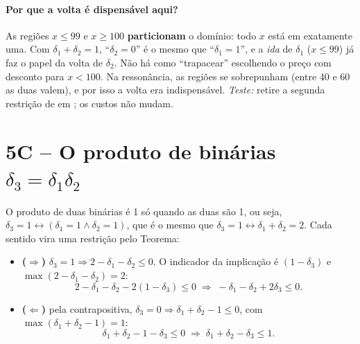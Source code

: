 \paragraph{Por que a volta é dispensável aqui?} As regiões $x\le99$ e $x\ge100$ \textbf{particionam} o domínio:
todo $x$ está em exatamente uma. Com $\delta_1+\delta_2=1$, ``$\delta_2=0$'' é o mesmo que ``$\delta_1=1$'', e a
\emph{ida} de $\delta_1$ ($x\le99$) já faz o papel da volta de $\delta_2$. Não há como ``trapacear'' escolhendo o
preço com desconto para $x<100$. Na ressonância, as regiões se sobrepunham (entre 40 e 60 as duas valem), e por isso
a volta era indispensável. \emph{Teste:} retire a segunda restrição de  em ; os
custos não mudam.

\section{5C -- O produto de binárias $\delta_3=\delta_1\delta_2$}

O produto de duas binárias é 1 só quando as duas são 1, ou seja, $\delta_3=1\leftrightarrow(\delta_1=1\wedge\delta_2=1)$,
que é o mesmo que $\delta_3=1\leftrightarrow\delta_1+\delta_2=2$. Cada sentido vira uma restrição pelo Teorema:

\begin{itemize}
  \item \textbf{($\Rightarrow$)} $\delta_3=1\Rightarrow 2-\delta_1-\delta_2\le0$. O indicador da implicação é
  $(1-\delta_3)$ e $\max(2-\delta_1-\delta_2)=2$:
  \[
  2-\delta_1-\delta_2-2(1-\delta_3)\le0 \;\Longrightarrow\; -\delta_1-\delta_2+2\delta_3\le0 .
  \]
  \item \textbf{($\Leftarrow$)} pela contrapositiva, $\delta_3=0\Rightarrow\delta_1+\delta_2-1\le0$, com
  $\max(\delta_1+\delta_2-1)=1$:
  \[
  \delta_1+\delta_2-1-\delta_3\le0 \;\Longrightarrow\; \delta_1+\delta_2-\delta_3\le1 .
  \]
\end{itemize}

